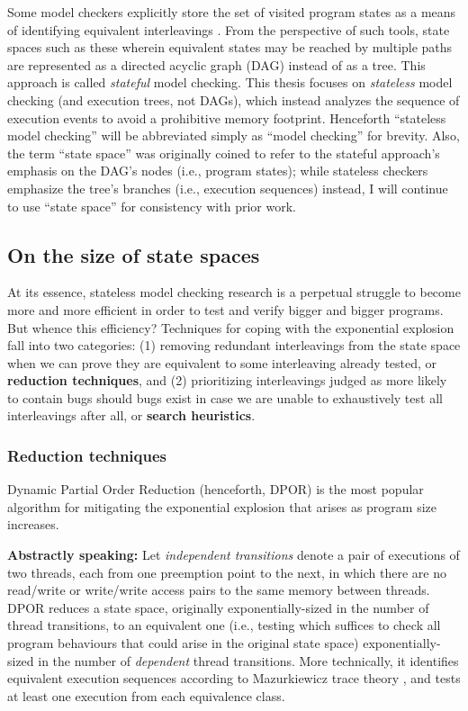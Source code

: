 Some model checkers explicitly store the set of visited program states as a means of identifying equivalent interleavings \cite{spin}.
From the perspective of such tools, state spaces such as these wherein equivalent states may be reached by multiple paths
are represented as a directed acyclic graph (DAG) instead of as a tree.
This approach is called {\em stateful} model checking.
This thesis focuses on {\em stateless} model checking (and execution trees, not DAGs),
which instead analyzes the sequence of execution events to avoid a prohibitive memory footprint.
Henceforth ``stateless model checking'' will be abbreviated simply as ``model checking'' for brevity.
Also, the term ``state space'' was originally coined to refer to the stateful approach's emphasis on the DAG's nodes
(i.e., program states);
while stateless checkers emphasize the tree's branches (i.e., execution sequences) instead,
I will continue to use ``state space'' for consistency with prior work.

\subsection{On the size of state spaces}

At its essence, stateless model checking research is a perpetual struggle to become more and more efficient in order to test and verify bigger and bigger programs.
But whence this efficiency?
Techniques for coping with the exponential explosion fall into two categories:
(1) removing redundant interleavings from the state space when we can prove they are equivalent to some interleaving already tested,
or {\bf reduction techniques},
and
(2) prioritizing interleavings judged as more likely to contain bugs should bugs exist
in case we are unable to exhaustively test all interleavings after all,
or {\bf search heuristics}.

\subsubsection{Reduction techniques}

Dynamic Partial Order Reduction \cite{dpor} (henceforth, DPOR) is the most popular algorithm for mitigating the exponential explosion that arises as program size increases.

{\bf Abstractly speaking:}
Let {\em independent transitions} denote a pair of executions of two threads, each from one preemption point to the next,
in which there are no read/write or write/write access pairs to the same memory between threads.
DPOR reduces a state space, originally exponentially-sized in the number of thread transitions,
to an equivalent one
(i.e., testing which suffices to check all program behaviours that could arise in the original state space)
exponentially-sized in the number of {\em dependent} thread transitions.
More technically, it identifies equivalent execution sequences according to Mazurkiewicz trace theory \cite{mazurkiewicz},
and tests at least one execution from each equivalence class.

